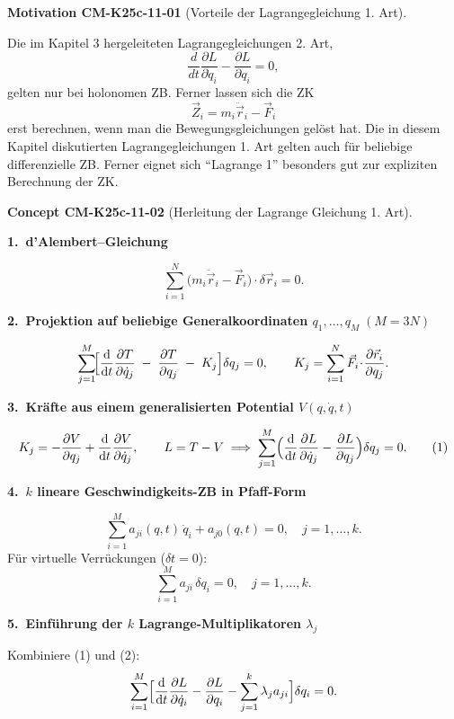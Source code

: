 \documentclass[10pt, letterpaper]{article}
\newcommand{\CustomHeading}[3]{%
  \par\medskip\noindent%
  \textbf{#1 #2} \textnormal{(#3)}.\enskip%
}
\newenvironment{CONC}[2]{\CustomHeading{Concept}{#1}{#2}}{}
\newenvironment{MOT}[2]{\CustomHeading{Motivation}{#1}{#2}}{}
\begin{document}
\begin{MOT}{CM-K25c-11-01}{Vorteile der Lagrangegleichung 1. Art}
Die im Kapitel 3 hergeleiteten Lagrangegleichungen 2. Art,
\[\frac{d}{dt}\frac{\partial L}{\partial \dot{q}_i} - \frac{\partial L}{\partial q_i} = 0,\]
gelten nur bei holonomen ZB. Ferner lassen sich die ZK
\[\vec{Z}_i = m_i\ddot{\vec{r}}_i-\vec{F}_i\] erst berechnen, wenn man die Bewegungsgleichungen gelöst hat. Die in diesem Kapitel diskutierten Lagrangegleichungen 1. Art gelten auch für beliebige differenzielle ZB. Ferner eignet sich ``Lagrange 1'' besonders gut zur expliziten Berechnung der ZK.
\end{MOT}

\begin{CONC}{CM-K25c-11-02}{Herleitung der Lagrange Gleichung 1. Art}
\textbf{1.\ d’Alembert–Gleichung}

\[
  \sum_{i=1}^{N}
    \bigl(m_i\ddot{\vec r}_i-\vec F_i\bigr)\!\cdot\!\delta\vec r_i=0 .
\]

\textbf{2.\ Projektion auf beliebige General­koordinaten
           $q_1,\dots,q_M\;(M=3N)$}

\[
  \sum_{j=1}^{M}
    \!\Bigl[
      \frac{\mathrm d}{\mathrm dt}
        \frac{\partial T}{\partial\dot q_j}
      \;-\;
      \frac{\partial T}{\partial q_j}
      \;-\;
      K_j
    \Bigr]\delta q_j = 0,
  \qquad
  K_j
  =\sum_{i=1}^{N}\vec F_i\!\cdot\!
     \frac{\partial\vec r_i}{\partial q_j}.
\]

\textbf{3.\ Kräfte aus einem generalisierten Potential
           $V(q,\dot q,t)$}

\[
  K_j
  =-\frac{\partial V}{\partial q_j}
    +\frac{\mathrm d}{\mathrm dt}
       \frac{\partial V}{\partial\dot q_j},
  \qquad
  L=T-V
  \;\Longrightarrow\;
  \sum_{j=1}^{M}
    \Bigl(
      \frac{\mathrm d}{\mathrm dt}
        \frac{\partial L}{\partial\dot q_j}
      -\frac{\partial L}{\partial q_j}
    \Bigr)\delta q_j = 0 .
\tag{1}
\]

\textbf{4.\ $k$ lineare Geschwindigkeits-ZB in Pfaff-Form}

\[
  \sum_{i=1}^{M}
    a_{ji}(q,t)\,\dot q_i + a_{j0}(q,t)=0,
  \quad
  j=1,\dots,k.
\]
Für virtuelle Verrückungen ($\delta t=0$):
\[
  \sum_{i=1}^{M}a_{ji}\,\delta q_i = 0,
  \quad j=1,\dots,k .
\tag{2}
\]

\textbf{5.\ Einführung der $k$ Lagrange-Multiplikatoren $\lambda_j$}

Kombiniere (1) und (2):
\[
  \sum_{i=1}^{M}
    \Bigl[
      \frac{\mathrm d}{\mathrm dt}
        \frac{\partial L}{\partial\dot q_i}
      -\frac{\partial L}{\partial q_i}
      -\sum_{j=1}^{k}\lambda_j a_{ji}
    \Bigr]\delta q_i = 0 .
\]


\end{CONC}
\end{document}
